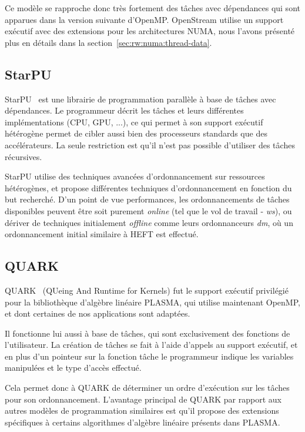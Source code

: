 Ce modèle se rapproche donc très fortement des tâches avec dépendances qui sont apparues dans la version suivante d'OpenMP.
OpenStream utilise un support exécutif avec des extensions pour les architectures NUMA, nous l'avons présenté plus en détails dans la section~\ref{sec:rw:numa:thread-data}.

\subsection{StarPU}

StarPU~\cite{StarPU} est une librairie de programmation parallèle à base de tâches avec dépendances.
Le programmeur décrit les tâches et leurs différentes implémentations (CPU, GPU, ...), ce qui permet à son support exécutif hétérogène permet de cibler aussi bien des processeurs standards que des accélérateurs.
La seule restriction est qu'il n'est pas possible d'utiliser des tâches récursives.

StarPU utilise des techniques avancées d'ordonnancement sur ressources hétérogènes, et propose différentes techniques d'ordonnancement en fonction du but recherché.
D'un point de vue performances, les ordonnancements de tâches disponibles peuvent être soit purement \emph{online} (tel que le vol de travail - \emph{ws}), ou dériver de techniques initialement \emph{offline} comme leurs ordonnanceurs \emph{dm}, où un ordonnancement initial similaire à HEFT est effectué.

\subsection{QUARK}

QUARK~\cite{Kurzak2013} (QUeing And Runtime for Kernels) fut le support exécutif privilégié pour la bibliothèque d'algèbre linéaire PLASMA, qui utilise maintenant OpenMP, et dont certaines de nos applications sont adaptées.

Il fonctionne lui aussi à base de tâches, qui sont exclusivement des fonctions de l'utilisateur.
La création de tâches se fait à l'aide d'appels au support exécutif, et en plus d'un pointeur sur la fonction tâche le programmeur indique les variables manipulées et le type d'accès effectué.

Cela permet donc à QUARK de déterminer un ordre d'exécution sur les tâches pour son ordonnancement.
L'avantage principal de QUARK par rapport aux autres modèles de programmation similaires est qu'il propose des extensions spécifiques à certains algorithmes d'algèbre linéaire présents dans PLASMA.

